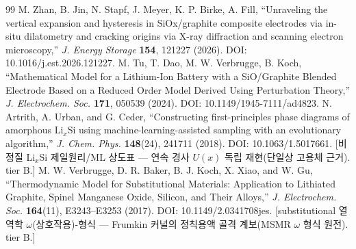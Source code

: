 \begin{thebibliography}{99}
 M. Zhan, B. Jin, N. Stapf, J. Meyer, K. P. Birke, A. Fill, ``Unraveling the vertical expansion and hysteresis in SiOx/graphite composite electrodes via in-situ dilatometry and cracking origins via X-ray diffraction and scanning electron microscopy,'' \emph{J. Energy Storage} \textbf{154}, 121227 (2026). DOI: 10.1016/j.est.2026.121227.
 M. Tu, T. Dao, M. W. Verbrugge, B. Koch, ``Mathematical Model for a Lithium-Ion Battery with a SiO/Graphite Blended Electrode Based on a Reduced Order Model Derived Using Perturbation Theory,'' \emph{J. Electrochem. Soc.} \textbf{171}, 050539 (2024). DOI: 10.1149/1945-7111/ad4823.
 N. Artrith, A. Urban, and G. Ceder, ``Constructing first-principles phase diagrams of amorphous Li$_x$Si using machine-learning-assisted sampling with an evolutionary algorithm,'' \emph{J. Chem. Phys.} \textbf{148}(24), 241711 (2018). DOI: 10.1063/1.5017661. [비정질 Li$_x$Si 제일원리/ML 상도표 --- 연속 경사 $U(x)$ 독립 재현(단일상 고용체 근거). tier B.]
 M. W. Verbrugge, D. R. Baker, B. J. Koch, X. Xiao, and W. Gu, ``Thermodynamic Model for Substitutional Materials: Application to Lithiated Graphite, Spinel Manganese Oxide, Silicon, and Their Alloys,'' \emph{J. Electrochem. Soc.} \textbf{164}(11), E3243--E3253 (2017). DOI: 10.1149/2.0341708jes. [substitutional 열역학 $\omega$(상호작용)-형식 --- Frumkin 커널의 정칙용액 골격 계보(MSMR $\omega$ 형식 원전). tier B.]
\end{thebibliography}
